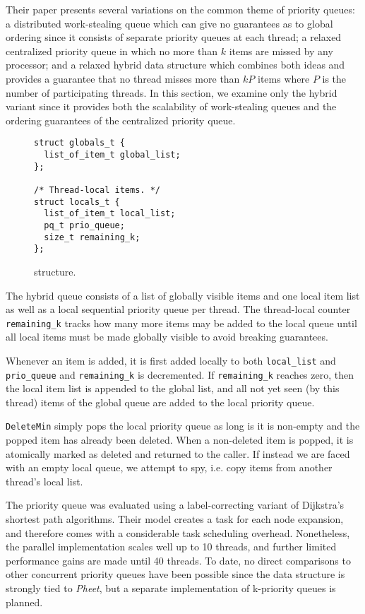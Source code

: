 \documentclass[a4paper,10pt]{article}
\begin{document}
Their paper presents several variations on the common theme of priority queues: a distributed work-stealing
queue which can give no guarantees as to global ordering since it consists of separate priority queues
at each thread; a relaxed centralized priority queue in which no more than $k$ items are missed
by any processor; and a relaxed hybrid data structure which combines both ideas and provides
a guarantee that no thread misses more than $kP$ items where $P$ is the number of participating threads.
In this section, we examine only the hybrid variant since it provides both the scalability of work-stealing
queues and the ordering guarantees of the centralized priority queue.

\begin{figure}[ht]
\begin{lstlisting}
struct globals_t {
  list_of_item_t global_list;
};

/* Thread-local items. */
struct locals_t {
  list_of_item_t local_list;
  pq_t prio_queue;
  size_t remaining_k;
};
\end{lstlisting}
\caption{\citeauthor{wimmer2013data} structure.}
\label{fig:wimmerq}
\end{figure}

The hybrid queue consists of a list of globally visible items and one local item list as well as a local
sequential priority queue per thread. The thread-local counter \lstinline|remaining_k| tracks how many more
items may be added to the local queue until all local items must be made globally visible to avoid
breaking guarantees.

Whenever an item is added, it is first added locally to both \lstinline|local_list| and \lstinline|prio_queue|
and \lstinline|remaining_k| is decremented. If \lstinline|remaining_k| reaches zero, then the local
item list is appended to the global list, and all not yet seen (by this thread) items of the global
queue are added to the local priority queue.

\lstinline|DeleteMin| simply pops the local priority queue as long is it is non-empty and the popped
item has already been deleted. When a non-deleted item is popped, it is atomically marked as deleted
and returned to the caller. If instead we are faced with an empty local queue, we attempt to spy,
i.e. copy items from another thread's local list.


The \citeauthor{wimmer2013data} priority queue was evaluated using a label-correcting variant
of Dijkstra's shortest path algorithms. Their model creates a task for each node
expansion, and therefore comes with a considerable task scheduling overhead. Nonetheless,
the parallel implementation scales well up to 10 threads, and further limited performance
gains are made until 40 threads. To date, no direct comparisons to other concurrent
priority queues have been possible since the data structure is strongly tied to \emph{Pheet},
but a separate implementation of k-priority queues is planned.
\end{document}
